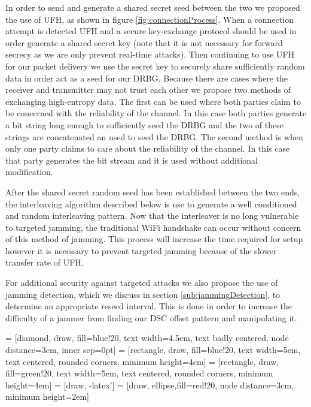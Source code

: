 \documentclass[sigconf]{acmart}
\begin{document}
In order to send and generate a shared secret seed between the two we proposed the use of UFH, as shown in figure \ref{fig:connectionProcess}. When a connection attempt is detected UFH and a secure key-exchange protocol should be used in order generate a shared secret key (note that it is not necessary for forward secrecy as we are only prevent real-time attacks). Then continuing to use UFH for our packet delivery we use the secret key to securely share sufficiently random data in order act as a seed for our DRBG. Because there are cases where the receiver and transmitter may not trust each other we propose two methods of exchanging high-entropy data. The first can be used where both parties claim to be concerned with the reliability of the channel. In this case both parties generate a bit string long enough to sufficiently seed the DRBG and the two of these strings are concatenated an used to seed the DRBG. The second method is when only one party claims to care about the reliability of the channel. In this case that party generates the bit stream and it is used without additional modification. 

After the shared secret random seed has been established between the two ends, the interleaving algorithm described below is use to generate a well conditioned and random interleaving pattern. Now that the interleaver is no long vulnerable to targeted jamming, the traditional WiFi handshake can occur without concern of this method of jamming. This process will increase the time required for setup however it is necessary to prevent targeted jamming because of the slower transfer rate of UFH\cite{strasser2008jamming}.

For additional security against targeted attacks we also propose the use of jamming detection, which we discuss in section \ref{sub:jammingDetection}, to determine an appropriate reseed interval. This is done in order to increase the difficulty of a jammer from finding our DSC offset pattern and manipulating it. 

 = [diamond, draw, fill=blue!20, 
    text width=4.5em, text badly centered, node distance=3cm, inner sep=0pt]
 = [rectangle, draw, fill=blue!20, 
    text width=5em, text centered, rounded corners, minimum height=4em]
 = [rectangle, draw, fill=green!20, 
    text width=5em, text centered, rounded corners, minimum height=4em]
 = [draw, -latex']
 = [draw, ellipse,fill=red!20, node distance=3cm,
    minimum height=2em]
\end{document}
